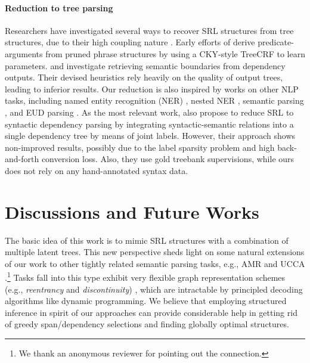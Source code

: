 \documentclass[11pt]{article}
\begin{document}
\paragraph{Reduction to tree parsing}
Researchers have investigated several ways to recover SRL structures from tree structures, due to their high coupling nature \cite{palmer-etal-2005-propbank}.
Early efforts of \citet{cohn-blunsom-2005-semantic} derive predicate-arguments from pruned phrase structures by using a CKY-style TreeCRF to learn parameters.
\citet{johansson-nugues-2008-dependency} and \citet{choi-palmer-2010-retrieving} investigate retrieving semantic boundaries from dependency outputs.
Their devised heuristics rely heavily on the quality of output trees, leading to inferior results.
Our reduction is also inspired by works on other NLP tasks, including named entity recognition (NER) \cite{yu-etal-2020-named}, nested NER \cite{fu-etal-2021-nested,lou-etal-2022-nested}, semantic parsing \cite{sun-etal-2017-semantic,jiang-etal-2019-hlt}, and EUD parsing \cite{anderson-gomez-rodriguez-2021-splitting}.
As the most relevant work, \citet{shi-etal-2020-semantic} also propose to reduce SRL to syntactic dependency parsing by integrating syntactic-semantic relations into a single dependency tree by means of joint labels.
However, their approach shows non-improved results, possibly due to the label sparsity problem and high back-and-forth conversion loss.
Also, they use gold treebank supervisions, while ours does not rely on any hand-annotated syntax data.

\section{Discussions and Future Works}
The basic idea of this work is to mimic SRL structures with a combination of multiple latent trees.
This new perspective sheds light on some natural extensions of our work to other tightly related semantic parsing tasks, e.g., AMR \cite{zhang-etal-2019-amr} and UCCA \cite{jiang-etal-2019-hlt}.\footnote{We thank an anonymous reviewer for pointing out the connection.}
Tasks fall into this type exhibit very flexible graph representation schemes (e.g., \emph{reentrancy} and \emph{discontinuity}) \cite{zhang-etal-2019-broad}, which are intractable by principled decoding algorithms like dynamic programming.
We believe that employing structured inference in spirit of our approaches can provide considerable help in getting rid of greedy span/dependency selections and finding globally optimal structures.
\end{document}
